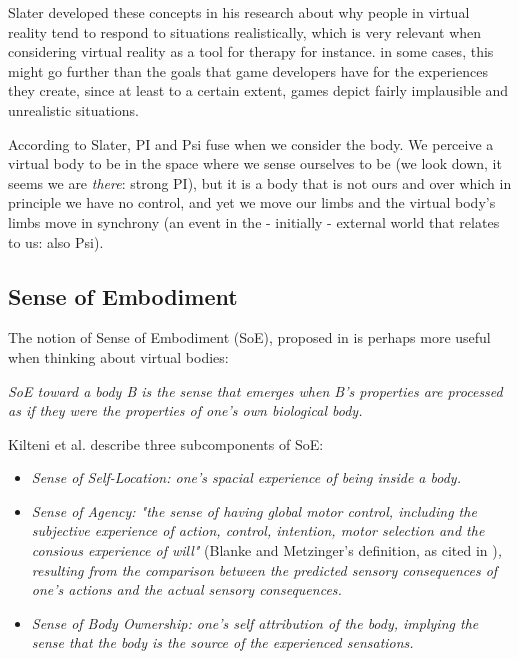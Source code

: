 Slater developed these concepts in his research about why people in virtual reality tend to respond to situations realistically, which is very relevant when considering virtual reality as a tool for therapy for instance. in some cases, this might go further than the goals that game developers have for the experiences they create, since at least to a certain extent, games depict fairly implausible and unrealistic situations.

According to Slater, PI and Psi fuse when we consider the body. We perceive a virtual body to be in the space where we sense ourselves to be (we look down, it seems we are \textit{there}: strong PI), but it is a body that is not ours and over which in principle we have no control, and yet we move our limbs and the virtual body's limbs move in synchrony (an event in the - initially - external world that relates to us: also Psi).

\subsection{Sense of Embodiment}
\label{subsec:embodiment}

The notion of Sense of Embodiment (SoE), proposed in \parencite{Kilteni2012} is perhaps more useful when thinking about virtual bodies:

\begin{displayquote}
\textit{SoE toward a body B is the sense that emerges when B's properties are processed as if they were the properties of one's own biological body.}
\end{displayquote}

Kilteni et al. describe three subcomponents of SoE:

\begin{displayquote}
\begin{itemize}
\item \textit{Sense of Self-Location: one's spacial experience of being inside a body.}
\item \textit{Sense of Agency: "the sense of having global motor control, including the subjective experience of action, control, intention, motor selection and the consious experience of will"} (Blanke and Metzinger's definition, as cited in \parencite{Kilteni2012})\textit{, resulting from the comparison between the predicted sensory consequences of one's actions and the actual sensory consequences.}
\item \textit{Sense of Body Ownership: one's self attribution of the body, implying the sense that the body is the source of the experienced sensations.}
\end{itemize}
\end{displayquote}

